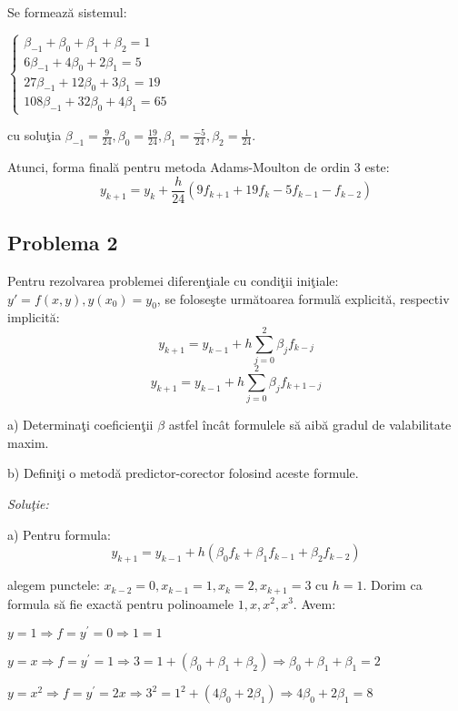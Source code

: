 \documentclass{exam}
\begin{document}
Se formează sistemul:
\begin{center}
	$\left\{
		\begin{array}{ll}
			\beta_{-1}+\beta_{0}+\beta_{1}+\beta_{2}= 1 \\
			6\beta_{-1}+4\beta_{0}+2\beta_{1}=5         \\
			27\beta_{-1}+12\beta_{0}+3\beta_{1} = 19    \\
			108\beta_{-1}+32\beta_{0}+4\beta_{1}=65
		\end{array}
		\right.$
\end{center}

\noindent cu soluţia $\beta_{-1} = \frac{9}{24}, \beta_{0} = \frac{19}{24},  \beta_{1} = \frac{-5}{24},  \beta_{2} = \frac{1}{24}$.

Atunci, forma finală pentru metoda Adams-Moulton de ordin 3 este:
$$y_{k+1}=y_{k}+\frac{h}{24}(9f_{k+1}+19f_{k}-5f_{k-1}-f_{k-2})$$


\subsection{Problema 2}

Pentru rezolvarea problemei diferenţiale cu condiţii iniţiale: $y{'} = f(x, y), y(x_{0}) = y_{0}$, se foloseşte următoarea formulă explicită, respectiv implicită:
$$y_{k+1}= y_{k-1} + h \sum_{j=0}^{2} {\beta_{j}f_{k-j}}$$
$$y_{k+1}= y_{k-1} + h \sum_{j=0}^{2} {\beta_{j}f_{k+1-j}}$$

a) Determinaţi coeficienţii $\beta$ astfel încât formulele să aibă gradul de valabilitate maxim.

b) Definiţi o metodă predictor-corector folosind aceste formule.

\textit{Soluţie:}

a) Pentru formula:
$$y_{k+1}=y_{k-1}+h(\beta_{0}f_{k}+\beta_{1}f_{k-1}+\beta_{2}f_{k-2})$$

\noindent alegem punctele: $x_{k-2}=0,x_{k-1}=1,x_{k}=2,x_{k+1}=3$ cu $h=1$. Dorim ca formula să fie exactă pentru polinoamele $1, x, x^2, x^3$. Avem:

$y=1 \Rightarrow f = y^{'} =0 \Rightarrow 1 = 1 $

$y=x \Rightarrow f = y^{'} =1 \Rightarrow 3 = 1 + (\beta_{0}+\beta_{1}+\beta_{2}) \Rightarrow \beta_{0} + \beta_{1} + \beta_{1}= 2 $

$y=x^2 \Rightarrow f = y^{'} =2x \Rightarrow 3^2 = 1^2 + (4\beta_{0}+2\beta_{1}) \Rightarrow 4\beta_{0}+2\beta_{1}= 8 $
\end{document}
